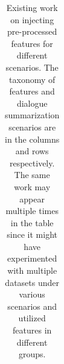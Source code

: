 \begin{table}
\begin{tabular}{|l|ccc|cc|c|}
		\bottomrule[1pt]
		
		
	\end{tabular}
	\caption{Existing work on injecting pre-processed features for 
different scenarios. The taxonomy of features and dialogue summarization 
scenarios are in the columns and rows respectively. The same work may appear 
multiple times in the table since it might have experimented with multiple 
datasets under various scenarios and utilized features in different groups.}
	\label{tab:correlation}
\end{table}


